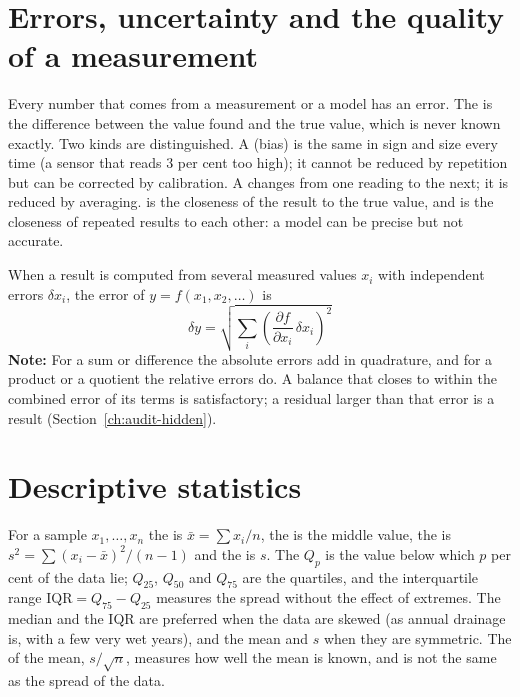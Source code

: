 \section{Errors, uncertainty and the quality of a measurement}
Every number that comes from a measurement or a model has an error. The  is the difference between the value found and the true value, which is never known exactly. Two kinds are distinguished. A  (bias) is the same in sign and size every time (a sensor that reads 3 per cent too high); it cannot be reduced by repetition but can be corrected by calibration. A  changes from one reading to the next; it is reduced by averaging.  is the closeness of the result to the true value, and  is the closeness of repeated results to each other: a model can be precise but not accurate.
\par\noindent When a result is computed from several measured values $x_i$ with independent errors $\delta x_i$, the error of $y=f(x_1,x_2,\dots)$ is
\begin{equation*}\boxed{\delta y=\sqrt{\sum_i\left(\frac{\partial f}{\partial x_i}\,\delta x_i\right)^2}}\end{equation*}
\noindent \textbf{Note:} For a sum or difference the absolute errors add in quadrature, and for a product or a quotient the relative errors do. A balance that closes to within the combined error of its terms is satisfactory; a residual larger than that error is a result (Section~\ref{ch:audit-hidden}).

\section{Descriptive statistics}
For a sample $x_1,\dots,x_n$ the  is $\bar x=\sum x_i/n$, the  is the middle value, the  is $s^2=\sum(x_i-\bar x)^2/(n-1)$ and the  is $s$. The  $Q_p$ is the value below which $p$ per cent of the data lie; $Q_{25}$, $Q_{50}$ and $Q_{75}$ are the quartiles, and the interquartile range $\mathrm{IQR}=Q_{75}-Q_{25}$ measures the spread without the effect of extremes. The median and the IQR are preferred when the data are skewed (as annual drainage is, with a few very wet years), and the mean and $s$ when they are symmetric. The  of the mean, $s/\sqrt n$, measures how well the mean is known, and is not the same as the spread of the data.

